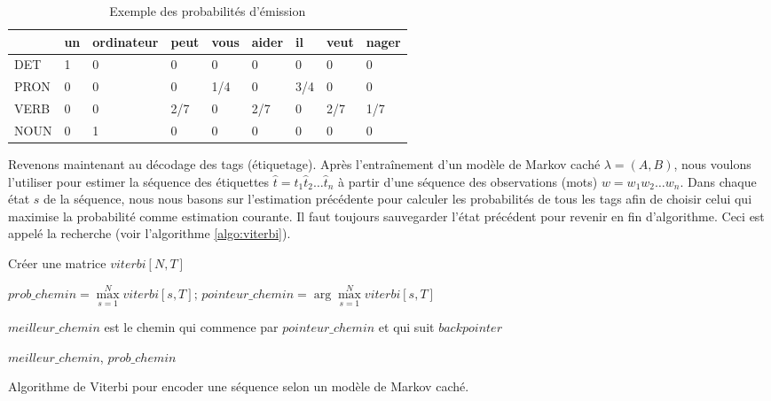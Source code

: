 \documentclass{KodeBook}
\begin{document}
\begin{table}[ht]
	\centering
\begin{tabular}{lllllllll}
	\cline{2-9}\noalign{\vskip\doublerulesep
		\vskip-\arrayrulewidth}\cline{2-9}
	     & un & ordinateur & peut & vous & aider & il & veut & nager \\
	\hline
	DET  &  1 &  0         &  0   &   0  &  0    & 0  & 0    & 0 \\
	PRON &  0 &  0         &  0   & 1/4  &  0    &3/4 & 0    & 0 \\
	VERB &  0 &  0         & 2/7  &   0  &  2/7  & 0  & 2/7  & 1/7 \\
	NOUN &  0 &  1         &  0   &   0  &  0    & 0  & 0    & 0 \\
	\hline\hline
\end{tabular}
\caption[Exemple des probabilités d'émission]{Exemple des probabilités d'émission \label{tab:hmm-emission}}
\end{table}

Revenons maintenant au décodage des tags (étiquetage). 
Après l'entraînement d'un modèle de Markov caché $\lambda = (A, B)$, nous voulons l'utiliser pour estimer la séquence des étiquettes $\hat{t} = \hat{t}_1 \hat{t}_2 \ldots \hat{t}_n$ à partir d'une séquence des observations (mots) $w = w_1 w_2 \ldots w_n$. 
Dans chaque état $s$ de la séquence, nous nous basons sur l'estimation précédente pour calculer les probabilités de tous les tags afin de choisir celui qui maximise la probabilité comme estimation courante. 
Il faut toujours sauvegarder l'état précédent pour revenir en fin d'algorithme. 
Ceci est appelé la recherche  (voir l'algorithme \ref{algo:viterbi}).

\begin{algorithm}[ht]
	
	Créer une matrice $viterbi[N, T]$\;
	
	
	
	$prob\_chemin = \max\limits_{s=1}^N viterbi[s, T];\, pointeur\_chemin = \arg\max\limits_{s=1}^N viterbi[s, T]$\;
	
	$meilleur\_chemin$ est le chemin qui commence par $pointeur\_chemin$ et qui suit $backpointer$
	
	\Return $meilleur\_chemin$, $prob\_chemin$\;
	\caption{Algorithme de Viterbi pour encoder une séquence selon un modèle de Markov caché.}
	\label{algo:viterbi}
\end{algorithm}
\end{document}
